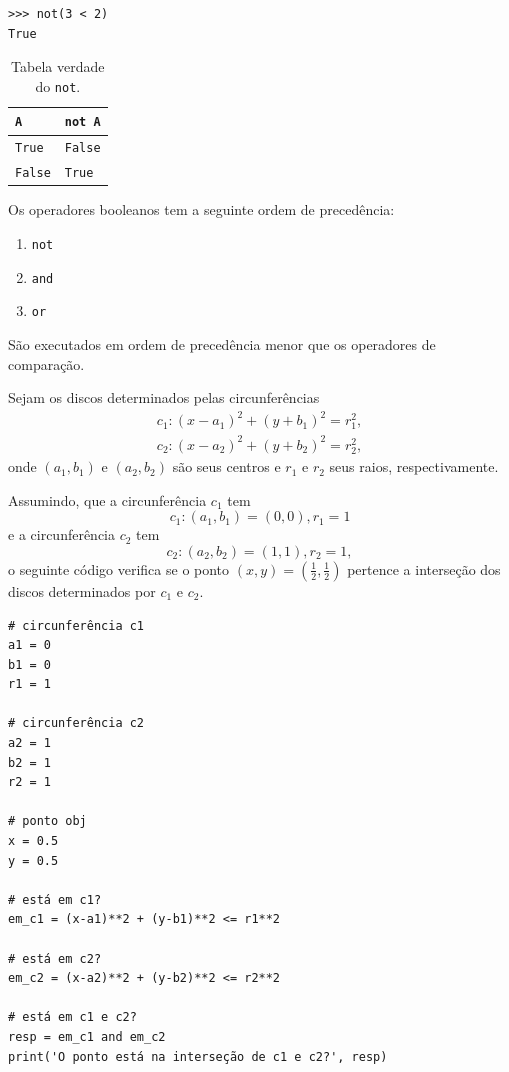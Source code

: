 \begin{itemize}
\begin{lstlisting}
>>> not(3 < 2)
True
\end{lstlisting}

  \begin{table}[H]
    \centering
    \caption{Tabela verdade do \lstinline+not+.}
    \begin{tabular}{l|l}
      \lstinline+A+ & \lstinline+not A+\\\hline
      \lstinline+True+ & \lstinline+False+\\
      \lstinline+False+ & \lstinline+True+\\\hline
    \end{tabular}
  \end{table}  
\end{itemize}

\begin{obs}
  Os operadores booleanos tem a seguinte ordem de precedência:
  \begin{enumerate}[1.]
  \item \lstinline+not+
  \item \lstinline+and+
  \item \lstinline+or+
  \end{enumerate}
  São executados em ordem de precedência menor que os operadores de comparação.
\end{obs}

\begin{ex}
  Sejam os discos determinados pelas circunferências
  \begin{gather}
    c_1: (x - a_1)^2 + (y + b_1)^2 = r_1^2,\\
    c_2: (x - a_2)^2 + (y + b_2)^2 = r_2^2,
  \end{gather}
  onde $(a_1, b_1)$ e $(a_2, b_2)$ são seus centros e $r_1$ e $r_2$ seus raios, respectivamente.

  Assumindo, que a circunferência $c_1$ tem
  \begin{equation}
    c_1: (a_1, b_1) = (0, 0), r_1 = 1
  \end{equation}
  e a circunferência $c_2$ tem
  \begin{equation}
    c_2: (a_2, b_2) = (1, 1), r_2 = 1,
  \end{equation}
  o seguinte código verifica se o ponto $(x, y) = \left(\frac{1}{2}, \frac{1}{2}\right)$ pertence a interseção dos discos determinados por $c_1$ e $c_2$.

\begin{lstlisting}
# circunferência c1
a1 = 0
b1 = 0
r1 = 1

# circunferência c2
a2 = 1
b2 = 1
r2 = 1

# ponto obj
x = 0.5
y = 0.5

# está em c1?
em_c1 = (x-a1)**2 + (y-b1)**2 <= r1**2

# está em c2?
em_c2 = (x-a2)**2 + (y-b2)**2 <= r2**2

# está em c1 e c2?
resp = em_c1 and em_c2
print('O ponto está na interseção de c1 e c2?', resp)
\end{lstlisting}
\end{ex}


